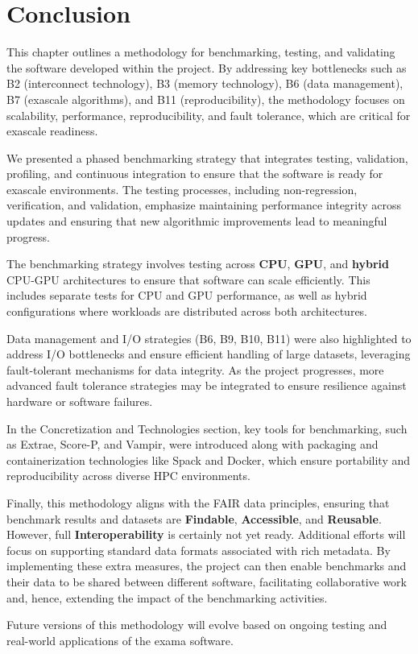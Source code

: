 \section{Conclusion}
\label{sec:Technology-conclusion}

This chapter outlines a methodology for benchmarking, testing, and validating the software developed within the \exama project. By addressing key bottlenecks such as \ac{B2} (interconnect technology), \ac{B3} (memory technology), \ac{B6} (data management), \ac{B7} (exascale algorithms), and \ac{B11} (reproducibility), the methodology focuses on scalability, performance, reproducibility, and fault tolerance, which are critical for exascale readiness.




We presented a phased benchmarking strategy that integrates testing, validation, profiling, and continuous integration to ensure that the software is ready for exascale environments. The testing processes, including non-regression, verification, and validation, emphasize maintaining performance integrity across updates and ensuring that new algorithmic improvements lead to meaningful progress.

The benchmarking strategy involves  testing across \textbf{CPU}, \textbf{GPU}, and \textbf{hybrid} CPU-GPU architectures to ensure that software can scale efficiently. This includes separate tests for CPU and GPU performance, as well as hybrid configurations where workloads are distributed across both architectures. 

Data management and I/O strategies (\ac{B6}, \ac{B9}, \ac{B10}, \ac{B11}) were also highlighted to address I/O bottlenecks and ensure efficient handling of large datasets, leveraging fault-tolerant mechanisms for data integrity. As the project progresses, more advanced fault tolerance strategies may be integrated to ensure resilience against hardware or software failures.

In the Concretization and Technologies section, key tools for benchmarking, such as Extrae, Score-P, and Vampir, were introduced along with packaging and containerization technologies like Spack and Docker, which ensure portability and reproducibility across diverse HPC environments. 

Finally, this methodology aligns with the \ac{FAIR} data principles, ensuring that benchmark results and datasets are \textbf{Findable}, \textbf{Accessible}, and \textbf{Reusable}. However, full \textbf{Interoperability} is certainly not yet ready. Additional efforts will focus on supporting standard data formats associated with rich metadata. By implementing these extra measures, the \exama project can then enable benchmarks and  their data to be shared between different software, facilitating collaborative work and, hence, extending the impact of the benchmarking activities.

Future versions of this methodology will evolve based on ongoing testing and real-world applications of the \ac{exama} software.

